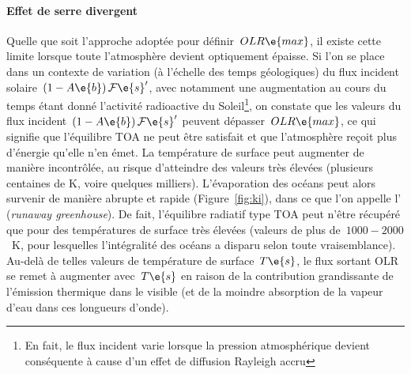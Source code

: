 

\sk
\paragraph{Effet de serre divergent} 
Quelle que soit l'approche adoptée pour définir~$OLR\e{max}$,
il existe cette limite lorsque toute l'atmosphère devient optiquement épaisse.
Si l'on se place dans un contexte de variation
(à l'échelle des temps géologiques) du flux incident
solaire~$(1-A\e{b}) \, \mathcal{F}\e{s}'$,
avec notamment une augmentation au cours du temps
étant donné l'activité radioactive du Soleil\footnote{En fait, le flux incident varie lorsque la pression atmosphérique devient conséquente à cause d'un effet de diffusion Rayleigh accru},
on constate que les valeurs du flux 
incident~$(1-A\e{b}) \, \mathcal{F}\e{s}'$ peuvent
dépasser~$OLR\e{max}$, ce qui signifie que
l'équilibre TOA ne peut être satisfait et que
l'atmosphère reçoit plus d'énergie qu'elle
n'en émet. La température de surface peut augmenter
de manière incontrôlée, au risque d'atteindre des valeurs
très élevées (plusieurs centaines de K, voire quelques milliers).
L'évaporation des océans peut alors
survenir de manière abrupte et rapide (Figure~\ref{fig:ki}),
dans ce que l'on appelle l'
(\emph{runaway greenhouse}). De fait, 
l'équilibre radiatif type TOA peut n'être
récupéré que pour des températures de surface 
très élevées (valeurs de plus de~$1000-2000$~K,
pour lesquelles l'intégralité des océans a disparu
selon toute vraisemblance).
Au-delà de telles valeurs de température de surface~$T\e{s}$,
le flux sortant OLR se remet à augmenter avec~$T\e{s}$
en raison de la contribution grandissante de l'émission
thermique dans le visible (et de la moindre absorption
de la vapeur d'eau dans ces longueurs d'onde).





